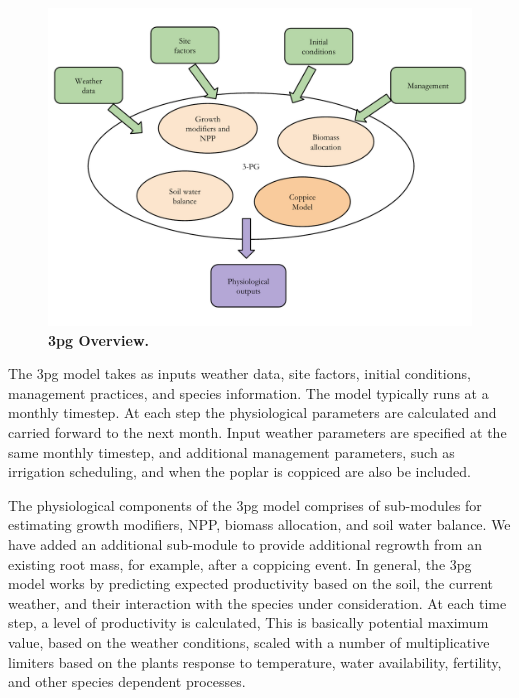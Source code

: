 \documentclass[10pt]{article}
\begin{document}
\begin{figure}[!ht]
\includegraphics[width=\linewidth]{model_overview}
\caption{ \textbf{\ac{3pg} Overview.}}
\label{fig:growth-model}
\end{figure}

The \ac{3pg} model takes as inputs weather data, site factors, initial
conditions, management practices, and species information.  The model
typically runs at a monthly timestep. At each step the physiological
parameters are calculated and carried forward to the next month. Input
weather parameters are specified at the same monthly timestep, and
additional management parameters, such as irrigation scheduling, and
when the poplar is coppiced are also be included.

The physiological components of the \ac{3pg} model comprises of
sub-modules for estimating growth modifiers, \ac{NPP}, biomass
allocation, and soil water balance.  We have added an additional
sub-module to provide additional regrowth from an existing root mass,
for example, after a coppicing event.  In general, the \ac{3pg} model
works by predicting expected productivity based on the soil, the
current weather, and their interaction with the species under
consideration.  At each time step, a level of productivity is
calculated, This is basically potential maximum value, based on the
weather conditions, scaled with a number of multiplicative limiters
based on the plants response to temperature, water availability,
fertility, and other species dependent processes.

\end{document}
